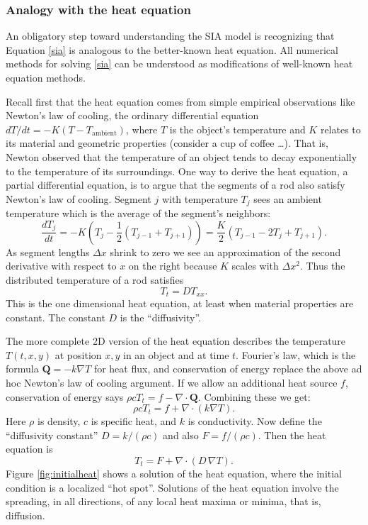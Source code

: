\documentclass[titlepage,letterpaper,final,12pt]{scrartcl}
\newcommand{\grad}{\nabla}
\newcommand{\Div}{\nabla\cdot}
\begin{document}
\subsubsection*{Analogy with the heat equation}  An obligatory step toward understanding the SIA model is recognizing that Equation \eqref{sia} is analogous to the better-known heat equation.  All numerical methods for solving \eqref{sia} can be understood as modifications of well-known heat equation methods.

Recall first that the heat equation comes from simple empirical observations like Newton's law of cooling, the ordinary differential equation $dT/dt = -K (T-T_{\text{ambient}})$, 
where $T$ is the object's temperature and $K$ relates to its material and geometric properties (consider a cup of coffee \dots).  That is, Newton observed that the temperature of an object tends to decay exponentially to the temperature of its surroundings.  One way to derive the heat equation, a partial differential equation, is to argue that the segments of a rod also satisfy Newton's law of cooling.  Segment $j$ with temperature $T_j$ sees an ambient temperature which is the average of the segment's neighbors:
   $$\frac{dT_j}{dt} = -K \left(T_j - \frac{1}{2} (T_{j-1} + T_{j+1}) \right) = \frac{K}{2} \left(T_{j-1} - 2 T_j + T_{j+1}\right).$$
As segment lengths $\Delta x$ shrink to zero we see an approximation of the second derivative with respect to $x$ on the right because $K$ scales with $\Delta x^2$.  Thus the distributed temperature of a rod satisfies
\begin{equation}
  T_t = D T_{xx}. \label{heat1D}
\end{equation}
This is the one dimensional heat equation, at least when material properties are constant.  The constant $D$ is the ``diffusivity''.

The more complete 2D version of the heat equation describes the temperature $T(t,x,y)$ at position $x,y$ in an object and at time $t$.  Fourier's law, which is the formula $\mathbf{Q} = - k \grad T$ for heat flux, and conservation of energy replace the above ad hoc Newton's law of cooling argument.  If we allow an additional heat source $f$, conservation of energy says $\rho c T_t = f - \Div \mathbf{Q}$.  Combining these we get:
	$$\rho c T_t = f + \Div (k \grad T).$$
Here $\rho$ is density, $c$ is specific heat, and $k$ is conductivity.  Now define the ``diffusivity constant'' $D=k/(\rho c)$ and also $F = f/(\rho c)$.  Then the heat equation is
\begin{equation}
T_t = F + \Div (D\, \grad T). \label{heat}
\end{equation}
Figure \ref{fig:initialheat} shows a solution of the heat equation, where the initial condition is a localized ``hot spot''.  Solutions of the heat equation involve the spreading, in all directions, of any local heat maxima or minima, that is, diffusion.
\end{document}
